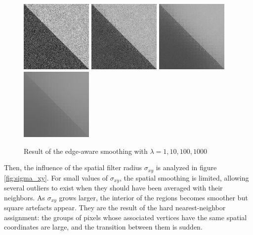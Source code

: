 \documentclass{article}
\begin{document}
\begin{figure}
    \centering
    \includegraphics[width=3.5cm]{pictures/BW/smoothing_diag_lambda_1_10_50_new.png}
    \includegraphics[width=3.5cm]{pictures/BW/smoothing_diag_lambda_10_10_50_new.png}
    \includegraphics[width=3.5cm]{pictures/BW/smoothing_diag_lambda_100_10_50_new.png}
    \includegraphics[width=3.5cm]{pictures/BW/smoothing_diag_lambda_1000_10_50_new.png}
    \caption{Result of the edge-aware smoothing with $\lambda = 1, 10, 100, 1000$}
    \label{fig:lambda}
\end{figure}

\medskip

Then, the influence of the spatial filter radius $\sigma_{xy}$ is analyzed in figure \ref{fig:sigma_xy}. For small values of $\sigma_{xy}$, the spatial smoothing is limited, allowing several outliers to exist when they should have been averaged with their neighbors. As $\sigma_{xy}$ grows larger, the interior of the regions becomes smoother but square artefacts appear. They are the result of the hard nearest-neighbor assignment: the groups of pixels whose associated vertices have the same spatial coordinates are large, and the transition between them is sudden.
\end{document}
